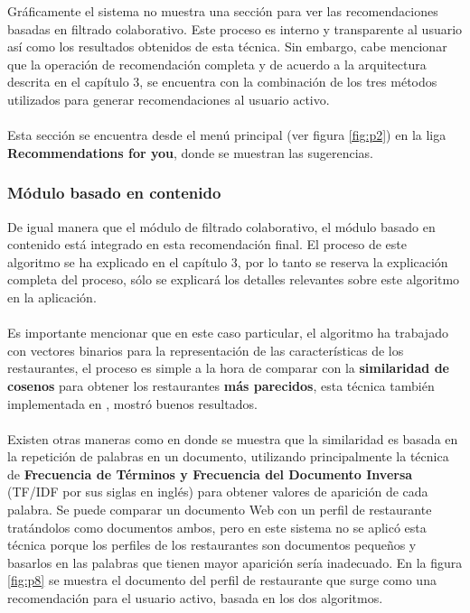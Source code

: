\documentclass[12pt,letterpaper,oneside] {memoir}
\begin{document}
Gráficamente el sistema no muestra una sección para ver las recomendaciones basadas en filtrado colaborativo. Este proceso es interno y transparente al usuario así como los resultados obtenidos de esta técnica. Sin embargo, cabe mencionar que la operación de recomendación completa y de acuerdo a la arquitectura descrita en el capítulo 3,  se encuentra con la combinación de los tres métodos utilizados para generar recomendaciones al usuario activo. 
\paragraph{}
Esta sección se encuentra desde el menú principal (ver figura \ref{fig:p2}) en la liga \textbf{Recommendations for you}, donde se muestran las sugerencias.

\subsubsection{Módulo basado en contenido}

De igual manera que el módulo de filtrado colaborativo, el módulo basado en contenido está integrado en esta recomendación final. El proceso de este algoritmo se ha explicado en el capítulo 3, por lo tanto se reserva la explicación completa del proceso, sólo se explicará los detalles relevantes sobre este algoritmo en la aplicación.
\paragraph{}
Es importante mencionar que en este caso particular, el algoritmo ha trabajado con vectores binarios para la representación de las características de los restaurantes, el proceso es simple a la hora de comparar con la \textbf{similaridad de cosenos} para obtener  los restaurantes \textbf{más parecidos}, esta técnica también implementada en \citep{Burke2002}, mostró buenos resultados.  
\paragraph{}
Existen otras maneras como en \citep{Cristian2010} donde se muestra que la similaridad es basada en la repetición de palabras en un documento, utilizando principalmente la técnica de \textbf{Frecuencia de Términos y Frecuencia del Documento Inversa} (TF/IDF por sus siglas en inglés) \citep{Adomavicius2005} para obtener valores de aparición de cada palabra.  
Se puede comparar un documento Web con un perfil de restaurante tratándolos como documentos ambos,  pero en este sistema no se aplicó esta técnica porque los perfiles de los restaurantes son documentos pequeños y basarlos en las palabras que tienen mayor aparición sería inadecuado. En la figura \ref{fig:p8} se muestra el documento del perfil de restaurante que surge como una recomendación para el usuario activo, basada en los dos algoritmos.\\
\end{document}
